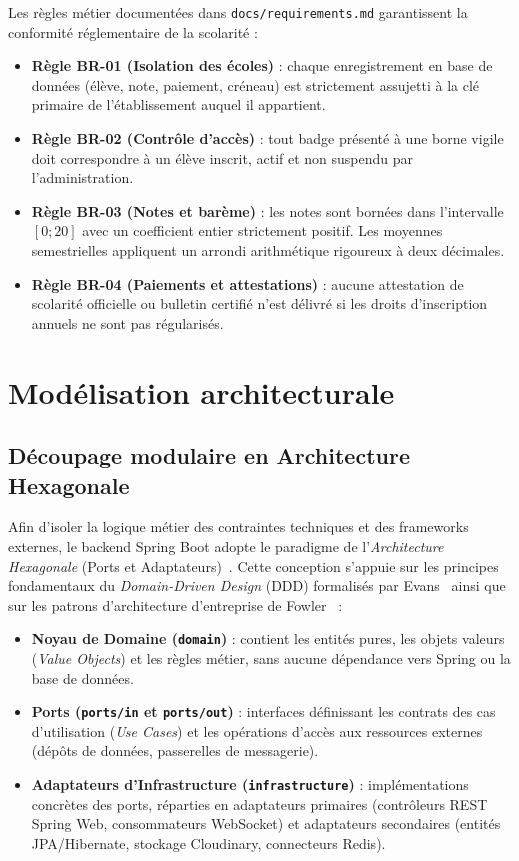 Les règles métier documentées dans \nolinkurl{docs/requirements.md} garantissent la conformité réglementaire de la scolarité :
\begin{itemize}
    \item \textbf{Règle BR-01 (Isolation des écoles)} : chaque enregistrement en base de données (élève, note, paiement, créneau) est strictement assujetti à la clé primaire de l'établissement auquel il appartient.
    \item \textbf{Règle BR-02 (Contrôle d'accès)} : tout badge présenté à une borne vigile doit correspondre à un élève inscrit, actif et non suspendu par l'administration.
    \item \textbf{Règle BR-03 (Notes et barème)} : les notes sont bornées dans l'intervalle $[0 ; 20]$ avec un coefficient entier strictement positif. Les moyennes semestrielles appliquent un arrondi arithmétique rigoureux à deux décimales.
    \item \textbf{Règle BR-04 (Paiements et attestations)} : aucune attestation de scolarité officielle ou bulletin certifié n'est délivré si les droits d'inscription annuels ne sont pas régularisés.
\end{itemize}

\section{Modélisation architecturale}

\subsection{Découpage modulaire en Architecture Hexagonale}

Afin d'isoler la logique métier des contraintes techniques et des frameworks externes, le backend Spring Boot adopte le paradigme de l'\emph{Architecture Hexagonale} (Ports et Adaptateurs)~\cite{cockburn2005hexagonal}. Cette conception s'appuie sur les principes fondamentaux du \emph{Domain-Driven Design} (DDD) formalisés par Evans~\cite{evans2004domain} ainsi que sur les patrons d'architecture d'entreprise de Fowler~\cite{fowler2002patterns} :
\begin{itemize}
    \item \textbf{Noyau de Domaine (\texttt{domain})} : contient les entités pures, les objets valeurs (\emph{Value Objects}) et les règles métier, sans aucune dépendance vers Spring ou la base de données.
    \item \textbf{Ports (\texttt{ports/in} et \texttt{ports/out})} : interfaces définissant les contrats des cas d'utilisation (\emph{Use Cases}) et les opérations d'accès aux ressources externes (dépôts de données, passerelles de messagerie).
    \item \textbf{Adaptateurs d'Infrastructure (\texttt{infrastructure})} : implémentations concrètes des ports, réparties en adaptateurs primaires (contrôleurs REST Spring Web, consommateurs WebSocket) et adaptateurs secondaires (entités JPA/Hibernate, stockage Cloudinary, connecteurs Redis).
\end{itemize}

